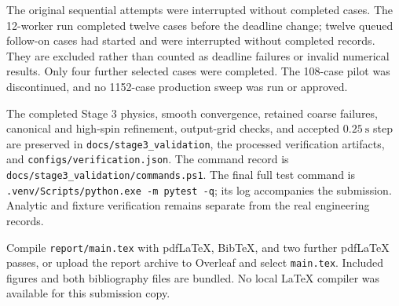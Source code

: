 The original sequential attempts were interrupted without completed cases.
The 12-worker run completed twelve cases before the deadline change;
twelve queued follow-on cases had started and were interrupted without
completed records. They are excluded rather than counted as deadline
failures or invalid numerical results. Only four further selected cases
were completed. The 108-case pilot was discontinued, and no 1152-case
production sweep was run or approved.

The completed Stage 3 physics, smooth convergence, retained coarse failures,
canonical and high-spin refinement, output-grid checks, and accepted
$0.25\ \mathrm{s}$ step are preserved in
\texttt{docs/stage3\_validation}, the processed verification artifacts,
and \texttt{configs/verification.json}. The command record is
\texttt{docs/stage3\_validation/commands.ps1}. The final full test command is
\texttt{.venv/Scripts/python.exe -m pytest -q}; its log accompanies the
submission. Analytic and fixture verification remains separate from
the real engineering records.

Compile \texttt{report/main.tex} with pdfLaTeX, BibTeX, and two further
pdfLaTeX passes, or upload the report archive to Overleaf and select
\texttt{main.tex}. Included figures and both bibliography files are bundled.
No local LaTeX compiler was available for this submission copy.
